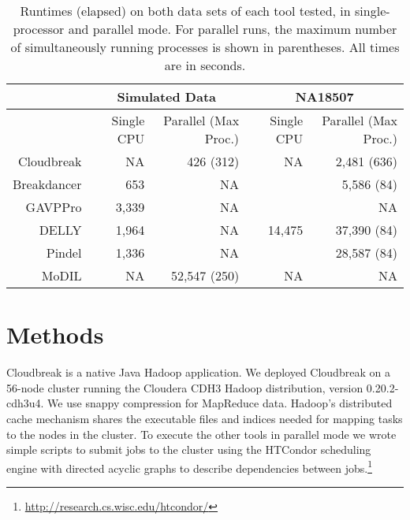 \documentclass[11pt]{article}
\begin{document}
\begin{table}[t]
\begin{center}
\begin{tabular}{rrr|rr}
 & \multicolumn{2}{c}{Simulated Data} & \multicolumn{2}{c}{NA18507} \\
\hline
 &  Single CPU & Parallel (Max Proc.) &  Single CPU & Parallel (Max Proc.) \\ 
  \hline
  Cloudbreak  &   NA    & 426 (312)       & NA         & 2,481 (636) \\ 
  Breakdancer &  653    & NA                 &              &  5,586 (84)  \\
  GAVPPro       &  3,339  & NA                &              & NA  \\
  DELLY          &  1,964  & NA                & 14,475  & 37,390 (84) \\
  Pindel          &  1,336  &  NA               &              & 28,587 (84) \\ 
  MoDIL         &  NA      & 52,547 (250)  & NA        & NA \\ 
   \hline
\end{tabular}
\end{center}
\caption{Runtimes (elapsed) on both data sets of each tool tested, in single-processor and parallel mode. For parallel runs, the maximum number of simultaneously running processes is shown in parentheses. All times are in seconds.}
\label{runtimes}
\end{table}

\section{Methods}\label{discussion}

Cloudbreak is a native Java Hadoop application. We deployed Cloudbreak on a 56-node cluster running the Cloudera CDH3 Hadoop distribution, version 0.20.2-cdh3u4. We use snappy compression for MapReduce data. Hadoop's distributed cache mechanism shares the executable files and indices needed for mapping tasks to the nodes in the cluster. To execute the other tools in parallel mode we wrote simple scripts to submit jobs to the cluster using the HTCondor scheduling engine with directed acyclic graphs to describe dependencies between jobs.\footnote{\url{http://research.cs.wisc.edu/htcondor/}}
\end{document}

